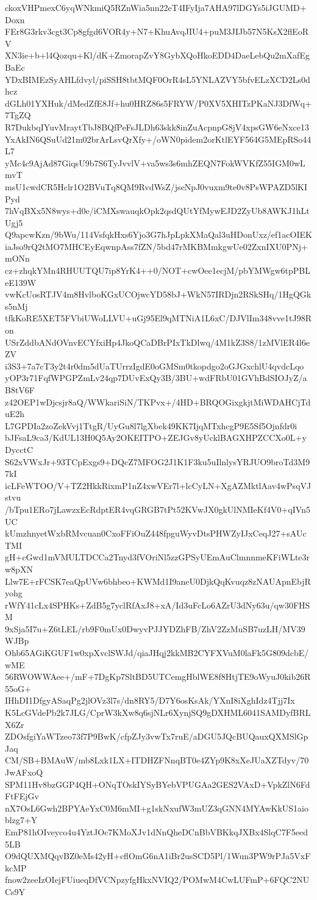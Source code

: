 ckoxVHPmexC6yqWNkmiQ5RZnWia5nn22eT4IFyIja7AHA97lDGYs5iJGUMD+Doxn
FEr8G3rkv3cgt3Cp8gfgd6VOR4y+N7+KhuAvqJIU4+puM3JIJb57N5KsX2flEoRV
XN3ie+b+l4Qozqu+Kl/dK+ZmorapZvY8GybXQoHkoEDD4DaeLebQu2mXafEgBaEc
YDxBIMEzSyAHLfdvyl/piSSH8tbtMQF0OrR4sL5YNLAZVY5bfvELzXCD2Ls0dhcz
dGLh01YXHuk/dMedZfE8Jf+hu0HRZ86s5FRYW/P0XV5XHITzPKaNJ3DfWq+7TgZQ
R7DukbqIYuvMraytTbJ8BQfPeFsJLDh63skk8inZuAcpnpG8jV4xpsGW6eNxce13
YxAkIN6QSuUd21m02brArLsvQrXfy+/oWN0pidem2orKtlEYF564G5MEpRSo44L7
yMc4c9AjAd87GiqsU9b7S6TyJvvlV+va5ws3s6mhZEQN7FokWVKfZ55IGM0wLmvT
msU1cwdCR5Hclr1O2BVuTq8QM9RvdWsZ/jseNpJ0vuxm9te0v8PsWPAZD5lKIPyd
7hVqBXx5N8wys+d0e/iCMXswauqkOpk2qsdQUtYfMywEJD2ZyUb8AWKJ1hLtUgj5
Q9apcwKzn/9bWu/114VsfqkHxs6Yjo3G7hJpLpkXMaQal3uHDonUxz/ef1acOIEK
iaJso9rQ2tMO7MHCEyEqwnpAss7fZN/5bd47rMKBMmkgwUe02ZxnIXU0PNj+mONn
cz+zhqkYMn4RHUUTQU7ip8YrK4++0/NOT+cwOee1ecjM/pbYMWgw6tpPBLeE139W
vwKcUosRTJV4m8HvlboKGxUCOjwcYD58bJ+WkN57IRDjn2RSkSHq/1HgQGks5nMj
tfkKoRE5XET5FVbiUWoLLVU+uGj95El9qMTNiA1L6xC/DJVlIm348vve1tJ98Ron
USrZddbANdOVnvECYfxiHp4JkoQCaDBrPIxTkDlwq/4M1kZ3S8/1zMVlER4l6eZV
i3S3+7a7cT3y2t4r0dm5dUaTUrrzIgdE0oGMSm0tkopdgo2oGJGxchlU4qvdcLqo
yOP3r71FqfWPGPZmLv24qp7DUvExQy3B/3BU+wdFRbU01GVhBdSIOJyZ/aB8tV6F
z42OEP1wDjcsjr8aQ/WWkariSiN/TKPvx+/4HD+BRQOGixgkjtMiWDAHCjTduE2h
L7GPDIa2zoZekVvj1TtgR/UyGu8l7lgXbek49KK7IjqMTxhcgP9E5Sf5Ojnfdr0i
bJFsaL9ca3/KdUL13H0Q5Ay2OKEITPO+ZEJGv8yUcklBAGXHPZCCXo0L+yDycctC
S62xVWxJr+93TCpExgs9+DQcZ7MFOG2J1K1F3ku5uIlnlysYRJUO9broTd3M97kI
icLFeWTOO/V+TZ2HkkRixmP1nZ4xwVEr7l+lcCyLN+XgAZMktlAav4wPsqVJstvu
/bTpu1ERo7jLawzxEcRdptER4vqGRGB7tPt52KVwJX0gkUlNMIeKf4V0+qIVn5UC
kUmzhnyetWxbRMvcuan0CxoFFiOuZ448fpguWyvDtsPHWZyIJxCeqJ27+sAUcTMI
gH+cGwd1mVMULTDCCa2Tnyd3fVOriNl5zzGPSyUEmAuClmnnmeKFiWLte3rw8pXN
Llw7E+rFCSK7eaQpUVw6bhbeo+KWMd1I9aneU0DjkQqKvuqz8zNAUApnEbjRyohg
rWfY41cLx4SPHKs+ZdB5g7yclRfAxJ8+xA/Id3uFcLo6AZrU3dNy63u/qw30FHSM
9xSja5I7u+Z6tLEL/rb9F0mUx0DwyvPJJYDZhFB/ZhV2ZzMuSB7uzLH/MV39WJBp
Ohb65AGiKGUF1w0xpXvclSWJd/qiaJHqj2kkMB2CYFXVuM0laFk5G809dcbE/wME
56RWOWWAee+/mF+7DgKp7SltBD5UTCemgHblWE8f8HtjTE9oWyuJ0kib26R55oG+
IHhDI1DfgyASaqPg2jlOVz3l7s/dn8RY5/D7Y6osKsAk/YXnI8iXghIdz4Tjj7Ix
K5LcGVdePb2k7JLG/CprW3kXw8q6sjNLr6XynjSQ9gDXHML6041SAMDyfBRLX6Zr
ZDOsfgiYaWTzeo73f7P9BwK/cfpZJy3vwTx7ruE/aDGU5JQcBUQauxQXMSlGpJaq
CM/SB+BMAuW/mb8Lxk1LX+ITDHZFNnqBT0e4ZYp9K8xXeJUaXZTdyv/70JwAFxoQ
SPM11Hv8bzGGP4QH+ONqTOskIYSyBYebVPUGAa2GES2VAxD+VpkZlN6FdFtFEjGv
nX7OsL6Gwh2BPYAeYxC0M6mMI+g1skNxufW3mUZ3qGNN4MYAwKkUS1aioblzg7+Y
EmP81hOIveyco4u4YztJOc7KMoXJv1dNnQheDCnBbVBKkqJXBx4SlqC7F5eed5LB
O9dQUXMQqvBZ0eMs42yH+cflOmG6nA1iBr2usSCD5Pl/1Wun3PW9rPJa5VxFkcMP
fnow2zeeIzOIejFUiueqDfVCNpzyfgHkxNVIQ2/POMwM4CwLUFmP+6FQC2NUCs9Y
